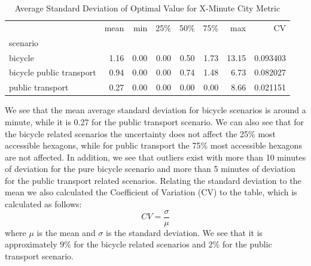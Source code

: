 \begin{table}
  \caption{Average Standard Deviation of Optimal Value for X-Minute City Metric}
  \label{tab:average_standard_deviation_of_optimal_value_for_x_minute_city_metric}
  \begin{center}
    \begin{tabular}{lrrrrrrr}
     & mean & min & 25\% & 50\% & 75\% & max & CV \\
    scenario &  &  &  &  &  &  &  \\
    bicycle & 1.16 & 0.00 & 0.00 & 0.50 & 1.73 & 13.15 & 0.093403 \\
    bicycle public transport & 0.94 & 0.00 & 0.00 & 0.74 & 1.48 & 6.73 & 0.082027 \\
    public transport & 0.27 & 0.00 & 0.00 & 0.00 & 0.00 & 8.66 & 0.021151 \\
    \end{tabular}
  \end{center}
\end{table}


We see that the mean average standard deviation for bicycle scenarios is around a minute, while it is 0.27 for the public transport scenario.
We can also see that for the bicycle related scenarios the uncertainty does not affect the 25\% most accessible hexagons, while for public transport the 75\% most accessible hexagons are not affected.
In addition, we see that outliers exist with more than 10 minutes of deviation for the pure bicycle scenario and more than 5 minutes of deviation for the public transport related scenarios.
Relating the standard deviation to the mean we also calculated the Coefficient of Variation (CV) to the table, which is calculated as follows:
$$ CV = \frac{\sigma}{\mu} $$
where $\mu$ is the mean and $\sigma$ is the standard deviation.
We see that it is approximately 9\% for the bicycle related scenarios and 2\% for the public transport scenario.

